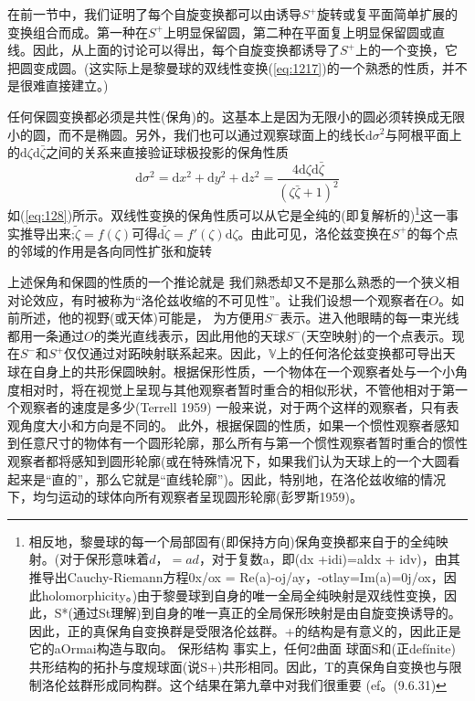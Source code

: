 \documentclass[utf8]{ctexbook}
\numberwithin{equation}{section}
\begin{document}
在前一节中，我们证明了每个自旋变换都可以由诱导$S^+$旋转或复平面简单扩展的变换组合而成。第一种在$S^+$上明显保留圆，第二种在平面复上明显保留圆或直线。因此，从上面的讨论可以得出，每个自旋变换都诱导了$S^+$上的一个变换，它把圆变成圆。(这实际上是黎曼球的双线性变换(\ref{eq:1217})的一个熟悉的性质，并不是很难直接建立。)

任何保圆变换都必须是共性(保角)的。这基本上是因为无限小的圆必须转换成无限小的圆，而不是椭圆。另外，我们也可以通过观察球面上的线长$\mathrm{d}\sigma^2 $与阿根平面上的$\mathrm{d}\zeta \mathrm{d}\bar{\zeta}$之间的关系来直接验证球极投影的保角性质
\begin{equation}
    \mathrm{d}\sigma^2 =\mathrm{d}x^2+\mathrm{d}y^2+\mathrm{d}z^2=\frac{4\mathrm{d}\zeta\mathrm{d}\bar{\zeta}}{(\zeta\bar{\zeta}+1)^2}
\end{equation}
如(\ref{eq:128})所示。双线性变换的保角性质可以从它是全纯的(即复解析的)\footnote{相反地，黎曼球的每一个局部固有(即保持方向)保角变换都来自于的全纯映射。(对于保形意味着$d，= ad$，对于复数a，即(dx +idi)=aldx + idv)，由其推导出Cauchy-Riemann方程0x/ox = Re(a)-oj/ay，-otlay=Im(a)=0j/ox，因此holomorphicity。)由于黎曼球到自身的唯一全局全纯映射是双线性变换，因此，S*(通过St理解)到自身的唯一真正的全局保形映射是由自旋变换诱导的。因此，正的真保角自变换群是受限洛伦兹群。+的结构是有意义的，因此正是它的aOrmai构造与取向。
保形结构
事实上，任何2曲面
球面S和(正defínite)共形结构的拓扑与度规球面(说S+)共形相同。因此，T的真保角自变换也与限制洛伦兹群形成同构群。这个结果在第九章中对我们很重要
(ef。(9.6.31)}这一事实推导出来;$\tilde{\zeta}=f(\zeta)$可得$\mathrm{d}\tilde{\zeta}=f'(\zeta)\mathrm{d}\zeta$。由此可见，洛伦兹变换在$S^+$的每个点的邻域的作用是各向同性扩张和旋转

上述保角和保圆的性质的一个推论就是
我们熟悉却又不是那么熟悉的一个狭义相对论效应，有时被称为“洛伦兹收缩的不可见性”。让我们设想一个观察者在$O$。如前所述，他的视野(或天体)可能是，
为方便用$S^-$表示。进入他眼睛的每一束光线都用一条通过$O$的类光直线表示，因此用他的天球$S^-$(天空映射)的一个点表示。现在$S^-$和$S^+$仅仅通过对跖映射联系起来。因此，$\mathbb{V}$上的任何洛伦兹变换都可导出天球在自身上的共形保圆映射。根据保形性质，一个物体在一个观察者处与一个小角度相对时，将在视觉上呈现与其他观察者暂时重合的相似形状，不管他相对于第一个观察者的速度是多少(Terrell 1959)
一般来说，对于两个这样的观察者，只有表观角度大小和方向是不同的。 此外，根据保圆的性质，如果一个惯性观察者感知到任意尺寸的物体有一个圆形轮廓，那么所有与第一个惯性观察者暂时重合的惯性观察者都将感知到圆形轮廓(或在特殊情况下，如果我们认为天球上的一个大圆看起来是“直的”，那么它就是“直线轮廓”)。因此，特别地，在洛伦兹收缩的情况下，均匀运动的球体向所有观察者呈现圆形轮廓(彭罗斯1959)。
\end{document}
